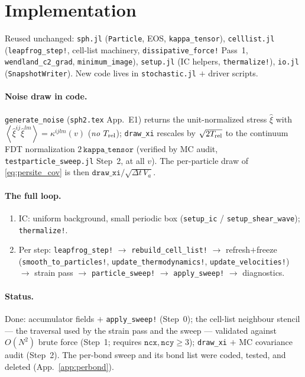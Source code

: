 \documentclass[12pt,aps,preprint,nofootinbib,noshowkeys,noshowpacs,longbibliography,superscriptaddress,tightenlines]{revtex4-2}
\def\llangle{\left\langle}
\def\rrangle{\right\rangle}
\def\app#1{App.~\ref{#1}}
\begin{document}
\section{Implementation}
\label{app:impl}

Reused unchanged: \texttt{sph.jl} (\texttt{Particle}, EOS,
\texttt{kappa\_tensor}), \texttt{celllist.jl} (\texttt{leapfrog\_step!},
cell-list machinery, \texttt{dissipative\_force!} Pass~1,
\texttt{wendland\_c2\_grad}, \texttt{minimum\_image}), \texttt{setup.jl} (IC
helpers, \texttt{thermalize!}), \texttt{io.jl} (\texttt{SnapshotWriter}).
New code lives in \texttt{stochastic.jl} $+$ driver scripts.

\paragraph{Noise draw in code.}
\texttt{generate\_noise} (\texttt{sph2.tex} App.~E1) returns the
unit-normalized stress $\hat\xi$ with
$\llangle\hat\xi^{ij}\hat\xi^{lm}\rrangle=\kappa^{ijlm}(v)$ (\emph{no}
$T_{\rm rel}$); \texttt{draw\_xi} rescales by $\sqrt{2T_{\rm rel}}$ to the
continuum FDT normalization $2\,\texttt{kappa\_tensor}$ (verified by MC
audit, \texttt{testparticle\_sweep.jl} Step~2, at all $v$).  The per-particle draw of
\eqref{eq:persite_cov} is then $\texttt{draw\_xi}/\sqrt{\Delta t\,V_a}$.

\paragraph{The full loop.}
\begin{enumerate}
  \item IC: uniform background, small periodic box (\texttt{setup\_ic} /
        \texttt{setup\_shear\_wave}); \texttt{thermalize!}.
  \item Per step: \texttt{leapfrog\_step!} $\to$ \texttt{rebuild\_cell\_list!}
        $\to$ refresh$+$freeze (\texttt{smooth\_to\_particles!},
        \texttt{update\_thermodynamics!}, \texttt{update\_velocities!}) $\to$
        strain pass $\to$ \texttt{particle\_sweep!} $\to$
        \texttt{apply\_sweep!} $\to$ diagnostics.
\end{enumerate}

\paragraph{Status.}
Done: accumulator fields $+$ \texttt{apply\_sweep!} (Step~0); the cell-list
neighbour stencil --- the traversal used by the strain pass and the sweep ---
validated against $O(N^2)$ brute force (Step~1; requires
$\texttt{ncx},\texttt{ncy}\ge3$); \texttt{draw\_xi} $+$ MC covariance audit
(Step~2).  The per-bond sweep and its bond list were coded, tested, and
deleted (\app{app:perbond}).
\end{document}
